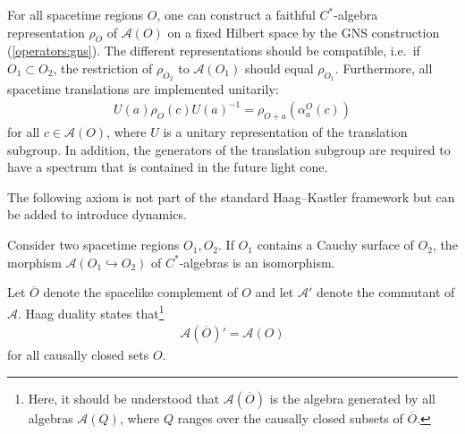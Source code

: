     \begin{axiom}[Spectrum]
        For all spacetime regions $O$, one can construct a faithful $C^*$-algebra representation $\rho_O$ of $\mathcal{A}(O)$ on a fixed Hilbert space by the GNS construction (\cref{operators:gns}). The different representations should be compatible, i.e.~if $O_1\subset O_2$, the restriction of $\rho_{O_2}$ to $\mathcal{A}(O_1)$ should equal $\rho_{O_1}$. Furthermore, all spacetime translations are implemented unitarily:
        \begin{gather}
            U(a)\rho_O(c)U(a)^{-1} = \rho_{O+a}\left(\alpha^O_a(c)\right)
        \end{gather}
        for all $c\in\mathcal{A}(O)$, where $U$ is a unitary representation of the translation subgroup. In addition, the generators of the translation subgroup are required to have a spectrum that is contained in the future light cone.
    \end{axiom}

    The following axiom is not part of the standard Haag--Kastler framework but can be added to introduce dynamics.
    \begin{axiom}
        Consider two spacetime regions $O_1,O_2$. If $O_1$ contains a Cauchy surface of $O_2$, the morphism $\mathcal{A}(O_1\hookrightarrow O_2)$ of $C^*$-algebras is an isomorphism.
    \end{axiom}

    \begin{axiom}
        Let $\overline{O}$ denote the spacelike complement of $O$ and let $\mathcal{A}'$ denote the commutant of $\mathcal{A}$. Haag duality states that\footnote{Here, it should be understood that $\mathcal{A}(\overline{O})$ is the algebra generated by all algebras $\mathcal{A}(Q)$, where $Q$ ranges over the causally closed subsets of $\overline{O}$.}
        \begin{gather}
            \mathcal{A}(\overline{O})' = \mathcal{A}(O)
        \end{gather}
        for all causally closed sets $O$.
    \end{axiom}

